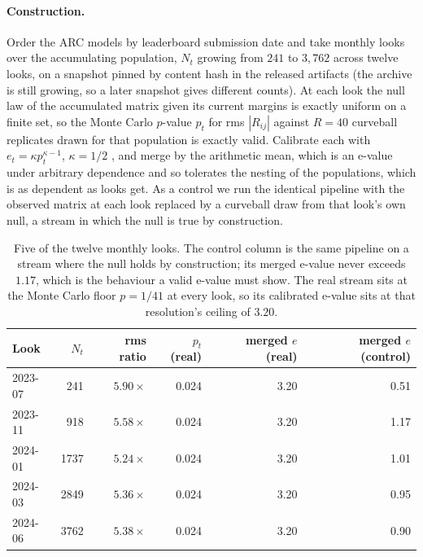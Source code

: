 \documentclass{article}
\begin{document}
\paragraph{Construction.} Order the ARC models by leaderboard submission date and take monthly
looks over the accumulating population, $N_t$ growing from $241$ to $3{,}762$ across twelve looks,
on a snapshot pinned by content hash in the released artifacts (the archive is still growing, so a
later snapshot gives different counts).
At each look the null law of the accumulated matrix given its current margins is exactly uniform on
a finite set, so the Monte Carlo $p$-value $p_t$ for rms $|R_{ij}|$ against $R=40$ curveball
replicates drawn for that population is exactly valid. Calibrate each with $e_t=\kappa
p_t^{\kappa-1}$, $\kappa=1/2$ \citep{vovkwang2021}, and merge by the arithmetic mean, which is an
e-value under arbitrary dependence \citep{vovkwang2021} and so tolerates the nesting of the
populations, which is as dependent as looks get. As a control we run the identical pipeline with
the observed matrix at each look replaced by a curveball draw from that look's own null, a stream
in which the null is true by construction.

\begin{table}[t]
\centering
\small
\begin{tabular}{lrrrrr}
\toprule
Look & $N_t$ & rms ratio & $p_t$ (real) & merged $e$ (real) & merged $e$ (control) \\
\midrule
2023-07 & 241   & $5.90\times$ & 0.024 & 3.20 & 0.51 \\
2023-11 & 918   & $5.58\times$ & 0.024 & 3.20 & 1.17 \\
2024-01 & 1737  & $5.24\times$ & 0.024 & 3.20 & 1.01 \\
2024-03 & 2849  & $5.36\times$ & 0.024 & 3.20 & 0.95 \\
2024-06 & 3762  & $5.38\times$ & 0.024 & 3.20 & 0.90 \\
\bottomrule
\end{tabular}
\caption{Five of the twelve monthly looks. The control column is the same pipeline on a stream
where the null holds by construction; its merged e-value never exceeds $1.17$, which is the
behaviour a valid e-value must show. The real stream sits at the Monte Carlo floor
$p=1/41$ at every look, so its calibrated e-value sits at that resolution's ceiling of $3.20$.}
\label{tab:monitor}
\end{table}
\end{document}
